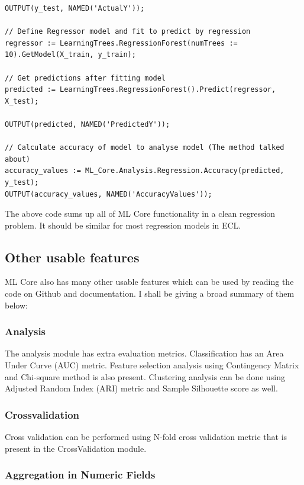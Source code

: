 \documentclass[a4paper,oneside,12pt]{book}
\begin{document}
\begin{lstlisting}
OUTPUT(y_test, NAMED('ActualY'));

// Define Regressor model and fit to predict by regression
regressor := LearningTrees.RegressionForest(numTrees := 10).GetModel(X_train, y_train);

// Get predictions after fitting model
predicted := LearningTrees.RegressionForest().Predict(regressor, X_test);

OUTPUT(predicted, NAMED('PredictedY'));

// Calculate accuracy of model to analyse model (The method talked about)
accuracy_values := ML_Core.Analysis.Regression.Accuracy(predicted, y_test);
OUTPUT(accuracy_values, NAMED('AccuracyValues'));
\end{lstlisting}

The above code sums up all of ML Core functionality in a clean regression problem. It should be similar for most regression models in ECL.

\subsection{Other usable features}

ML Core also has many other usable features which can be used by reading the code on Github and documentation. I shall be giving a broad summary of them below:

\subsubsection{Analysis}

The analysis module has extra evaluation metrics. Classification has an Area Under Curve (AUC) metric. Feature selection analysis using Contingency Matrix and Chi-square method is also present. Clustering analysis can be done using Adjusted Random Index (ARI) metric and Sample Silhouette score as well.

\subsubsection{Crossvalidation}

Cross validation can be performed using N-fold cross validation metric that is present in the CrossValidation module.

\subsubsection{Aggregation in Numeric Fields}
\end{document}
